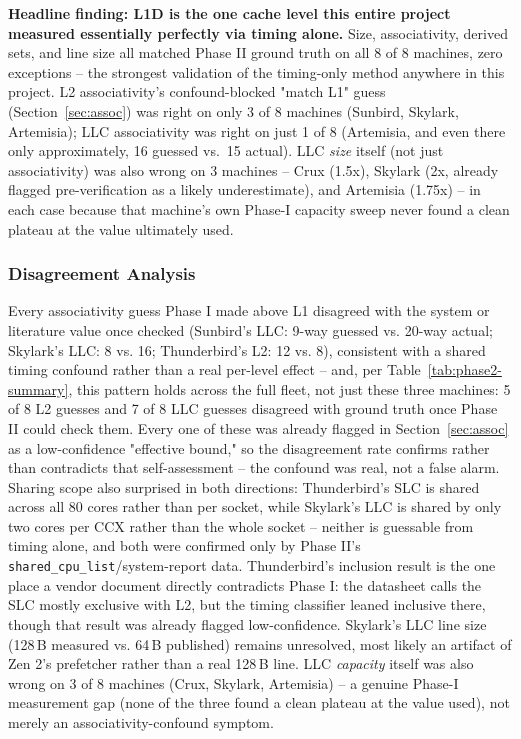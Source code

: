 \documentclass{article}
\begin{document}
\textbf{Headline finding: L1D is the one cache level this entire project measured
essentially perfectly via timing alone.} Size, associativity, derived sets, and line size
all matched Phase II ground truth on all 8 of 8 machines, zero exceptions -- the strongest
validation of the timing-only method anywhere in this project. L2 associativity's
confound-blocked "match L1" guess (Section~\ref{sec:assoc}) was right on only 3 of 8
machines (Sunbird, Skylark, Artemisia); LLC associativity was right on just 1 of 8
(Artemisia, and even there only approximately, 16 guessed vs.\ 15 actual). LLC \emph{size}
itself (not just associativity) was also wrong on 3 machines -- Crux (1.5x), Skylark (2x,
already flagged pre-verification as a likely underestimate), and Artemisia (1.75x) -- in
each case because that machine's own Phase-I capacity sweep never found a clean plateau at
the value ultimately used.

\subsubsection{Disagreement Analysis}
Every associativity guess Phase I made above L1 disagreed with the system or literature value once checked (Sunbird's LLC: 9-way guessed vs. 20-way actual; Skylark's LLC: 8 vs. 16; Thunderbird's L2: 12 vs. 8), consistent with a shared timing confound rather than a real per-level effect -- and, per Table~\ref{tab:phase2-summary}, this pattern holds across the full fleet, not just these three machines: 5 of 8 L2 guesses and 7 of 8 LLC guesses disagreed with ground truth once Phase II could check them. Every one of these was already flagged in Section~\ref{sec:assoc} as a low-confidence "effective bound," so the disagreement rate confirms rather than contradicts that self-assessment -- the confound was real, not a false alarm. Sharing scope also surprised in both directions: Thunderbird's SLC is shared across all 80 cores rather than per socket, while Skylark's LLC is shared by only two cores per CCX rather than the whole socket -- neither is guessable from timing alone, and both were confirmed only by Phase II's \texttt{shared\_cpu\_list}/system-report data. Thunderbird's inclusion result is the one place a vendor document directly contradicts Phase I: the datasheet calls the SLC mostly exclusive with L2, but the timing classifier leaned inclusive there, though that result was already flagged low-confidence. Skylark's LLC line size (128\,B measured vs. 64\,B published) remains unresolved, most likely an artifact of Zen 2's prefetcher rather than a real 128\,B line. LLC \emph{capacity} itself was also wrong on 3 of 8 machines (Crux, Skylark, Artemisia) -- a genuine Phase-I measurement gap (none of the three found a clean plateau at the value used), not merely an associativity-confound symptom.
\end{document}
